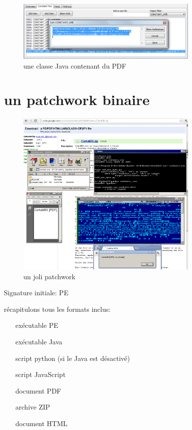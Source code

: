 \begin{figure}[ht]
  \centering
  \includegraphics[width=0.8\textwidth]{albertini/img/pdfpool}
  \caption{une classe Java contenant du PDF}
  \label{fig:albertini:pdfpool}
\end{figure}

\section{un patchwork binaire}
\begin{figure}[ht]
  \centering
  \includegraphics[width=0.8\textwidth]{albertini/img/corkamix}
  \caption{un joli patchwork}
  \label{fig:albertini:corkamix}
\end{figure}

Signature initiale: PE

récapitulons tous les formats inclus:
\begin{itemize}
\item[exécutable] PE
\item[exécutable] Java
\item[script] python (si le Java est désactivé)
\item[script] JavaScript
\item[document] PDF
\item[archive] ZIP
\item[document] HTML
\end{itemize}


